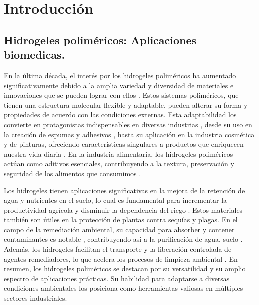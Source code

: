 
\chapter{Introducci\'on}
\label{Chapter1} %



\section{Hidrogeles polim\'ericos: Aplicaciones biomedicas.} 

En la \'ultima d\'ecada, el inter\'es por los hidrogeles polim\'ericos ha aumentado significativamente debido a la amplia variedad y diversidad de materiales e innovaciones que se pueden lograr con ellos .
Estos sistemas polim\'ericos, que tienen una estructura molecular flexible y adaptable, pueden alterar su forma y propiedades de acuerdo con las condiciones externas.
Esta adaptabilidad los convierte en protagonistas indispensables en diversas industrias \cite{zhu2022review}, desde su uso en la creaci\'on de espumas y adhesivos \cite{wu2021review, chowdhury2019novel}, hasta su aplicaci\'on en la industria cosm\'etica y de pinturas, ofreciendo caracter\'isticas singulares a productos que enriquecen nuestra vida diaria \cite{hirst2019fundamentals}.
En la industria alimentaria, los hidrogeles polim\'ericos act\'uan como aditivos esenciales, contribuyendo a la textura, preservaci\'on y seguridad de los alimentos que consumimos \cite{kwok2019microgel}.

Los hidrogeles tienen aplicaciones significativas en la mejora de la retenci\'on de agua y nutrientes en el suelo, lo cual es fundamental para incrementar la productividad agr\'icola y disminuir la dependencia del riego \cite{el2004radiation}. Estos materiales tambi\'en son \'utiles en la protecci\'on de plantas contra sequ\'ias y plagas.
En el campo de la remediaci\'on ambiental, su capacidad para absorber y contener contaminantes es notable \cite{perez2018using,perez2019molecular}, contribuyendo as\'i a la purificaci\'on de agua, suelo \cite{mehrotra2021use}. Adem\'as, los hidrogeles facilitan el transporte y la liberaci\'on controlada de agentes remediadores, lo que acelera los procesos de limpieza ambiental \cite{mehrotra2021use}.
En resumen, los hidrogeles polim\'ericos se destacan por su versatilidad y su amplio espectro de aplicaciones pr\'acticas. Su habilidad para adaptarse a diversas condiciones ambientales los posiciona como herramientas valiosas en m\'ultiples sectores industriales.


